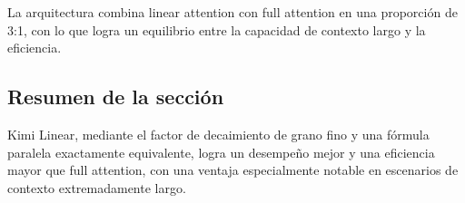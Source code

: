 La arquitectura combina linear attention con full attention en una proporción de 3:1, con lo que logra un equilibrio entre la capacidad de contexto largo y la eficiencia.

\subsection{Resumen de la sección}

Kimi Linear, mediante el factor de decaimiento de grano fino y una fórmula paralela exactamente equivalente, logra un desempeño mejor y una eficiencia mayor que full attention, con una ventaja especialmente notable en escenarios de contexto extremadamente largo.

